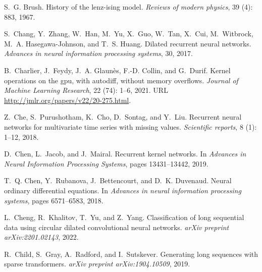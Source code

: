 \documentclass{MITcsail}
\begin{document}
\begin{thebibliography}{96}
S.~G. Brush.
\newblock History of the lenz-ising model.
\newblock \emph{Reviews of modern physics}, 39 (4): 883,
  1967.

S.~Chang, Y.~Zhang, W.~Han, M.~Yu, X.~Guo, W.~Tan, X.~Cui, M.~Witbrock, M.~A.
  Hasegawa-Johnson, and T.~S. Huang.
\newblock Dilated recurrent neural networks.
\newblock \emph{Advances in neural information processing systems}, 30, 2017.

B.~Charlier, J.~Feydy, J.~A. Glaunès, F.-D. Collin, and G.~Durif.
\newblock Kernel operations on the gpu, with autodiff, without memory
  overflows.
\newblock \emph{Journal of Machine Learning Research}, 22
  (74): 1--6, 2021.
\newblock URL \url{http://jmlr.org/papers/v22/20-275.html}.

Z.~Che, S.~Purushotham, K.~Cho, D.~Sontag, and Y.~Liu.
\newblock Recurrent neural networks for multivariate time series with missing
  values.
\newblock \emph{Scientific reports}, 8 (1): 1--12, 2018.

D.~Chen, L.~Jacob, and J.~Mairal.
\newblock Recurrent kernel networks.
\newblock In \emph{Advances in Neural Information Processing Systems}, pages
  13431--13442, 2019.

T.~Q. Chen, Y.~Rubanova, J.~Bettencourt, and D.~K. Duvenaud.
\newblock Neural ordinary differential equations.
\newblock In \emph{Advances in neural information processing systems}, pages
  6571--6583, 2018.

L.~Cheng, R.~Khalitov, T.~Yu, and Z.~Yang.
\newblock Classification of long sequential data using circular dilated
  convolutional neural networks.
\newblock \emph{arXiv preprint arXiv:2201.02143}, 2022.

R.~Child, S.~Gray, A.~Radford, and I.~Sutskever.
\newblock Generating long sequences with sparse transformers.
\newblock \emph{arXiv preprint arXiv:1904.10509}, 2019.


\end{thebibliography}
\end{document}
